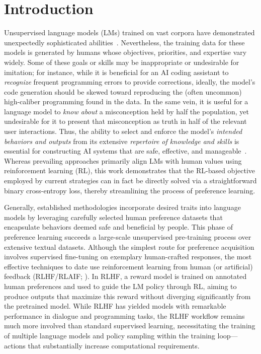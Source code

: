 \section{Introduction}
Unsupervised language models (LMs) trained on vast corpora have demonstrated unexpectedly sophisticated abilities~\citep{chowdhery2022palm, brown2020language, touvron2023llama, bubeck2023sparks}. Nevertheless, the training data for these models is generated by humans whose objectives, priorities, and expertise vary widely. Some of these goals or skills may be inappropriate or undesirable for imitation; for instance, while it is beneficial for an AI coding assistant to \textit{recognize} frequent programming errors to provide corrections, ideally, the model’s code generation should be skewed toward reproducing the (often uncommon) high-caliber programming found in the data. In the same vein, it is useful for a language model to \textit{know about} a misconception held by half the population, yet undesirable for it to present that misconception as truth in half of the relevant user interactions. Thus, the ability to select and enforce the model’s \emph{intended behaviors and outputs} from its extensive \textit{repertoire of knowledge and skills} is essential for constructing AI systems that are safe, effective, and manageable~\citep{ouyang2022training}. Whereas prevailing approaches primarily align LMs with human values using reinforcement learning (RL), this work demonstrates that the RL-based objective employed by current strategies can in fact be directly solved via a straightforward binary cross-entropy loss, thereby streamlining the process of preference learning.

Generally, established methodologies incorporate desired traits into language models by leveraging carefully selected human preference datasets that encapsulate behaviors deemed safe and beneficial by people. This phase of preference learning succeeds a large-scale unsupervised pre-training process over extensive textual datasets. Although the simplest route for preference acquisition involves supervised fine-tuning on exemplary human-crafted responses, the most effective techniques to date use reinforcement learning from human (or artificial) feedback (RLHF/RLAIF; \citep{christiano2017deep,bai2022constitutional}). In RLHF, a reward model is trained on annotated human preferences and used to guide the LM policy through RL, aiming to produce outputs that maximize this reward without diverging significantly from the pretrained model. While RLHF has yielded models with remarkable performance in dialogue and programming tasks, the RLHF workflow remains much more involved than standard supervised learning, necessitating the training of multiple language models and policy sampling within the training loop—actions that substantially increase computational requirements.

